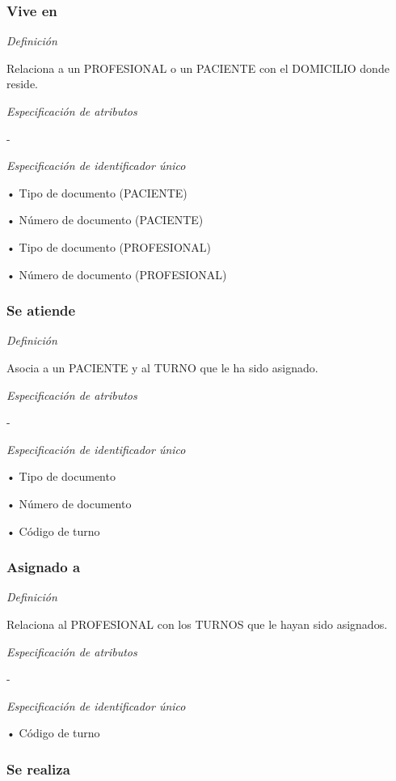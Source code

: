 \documentclass[a4paper,11pt]{article}
\begin{document}
\subsubsection{\textbf{Vive en}}

\textit{Definición}

Relaciona a un PROFESIONAL o un PACIENTE con el DOMICILIO donde reside.

\textit{Especificación de atributos}

-

\textit{Especificación de identificador único}

• Tipo de documento (PACIENTE)

• Número de documento (PACIENTE)

• Tipo de documento (PROFESIONAL)

• Número de documento (PROFESIONAL)\label{HToc293405819}

\subsubsection{\textbf{Se atiende}}

\textit{Definición}

Asocia a un PACIENTE y al TURNO que le ha sido asignado.

\textit{Especificación de atributos}

-

\textit{Especificación de identificador único}

• Tipo de documento

• Número de documento

• Código de turno\label{HToc293405820}

\subsubsection{\textbf{Asignado a}}

\textit{Definición}

Relaciona al PROFESIONAL con los TURNOS que le hayan sido asignados.

\textit{Especificación de atributos}

-

\textit{Especificación de identificador único}

• Código de turno\label{HToc293405821}

\subsubsection{\textbf{Se realiza}}
\end{document}
